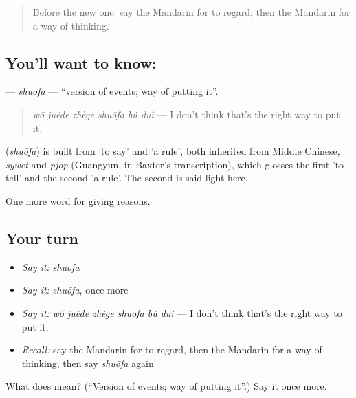 \label{lesson:ZH-C349-shuofa}



\begin{quote}
Before the new one: say the Mandarin for to regard, then the Mandarin for a way of thinking.
\end{quote}

\subsection*{You'll want to know: }
\textbf{} — \emph{shuōfa} — \textquotedblleft{}version of events; way of putting it\textquotedblright{}.

\begin{quote}
\textbf{} \emph{wǒ juéde zhège shuōfa bú duì} — I don't think that's the right way to put it.
\end{quote}

\begin{cousinweb}
\textbf{} (\emph{shuōfa}) is built from  'to say' and  'a rule', both inherited from Middle Chinese, \emph{sywet} and \emph{pjop} (Guangyun, in Baxter's transcription), which glosses the first 'to tell' and the second 'a rule'. The second is said light here.
\end{cousinweb}

\begin{grammarlens}[title={What you've built}]
One more word for giving reasons.
\end{grammarlens}

\subsection*{Your turn}
\begin{itemize}
\raggedright
  \item \emph{Say it:} \emph{shuōfa}
  \item \emph{Say it:} \emph{shuōfa}, once more
  \item \emph{Say it:} \emph{wǒ juéde zhège shuōfa bú duì} — I don't think that's the right way to put it.
  \item \emph{Recall:} say the Mandarin for to regard, then the Mandarin for a way of thinking, then say \emph{shuōfa} again
\end{itemize}

\begin{tcolorbox}[breakable,colback=teal!4,colframe=teal!35!black,title={Before you move on}]
What does  mean? (\textquotedblleft{}Version of events; way of putting it\textquotedblright{}.) Say it once more.
\end{tcolorbox}

